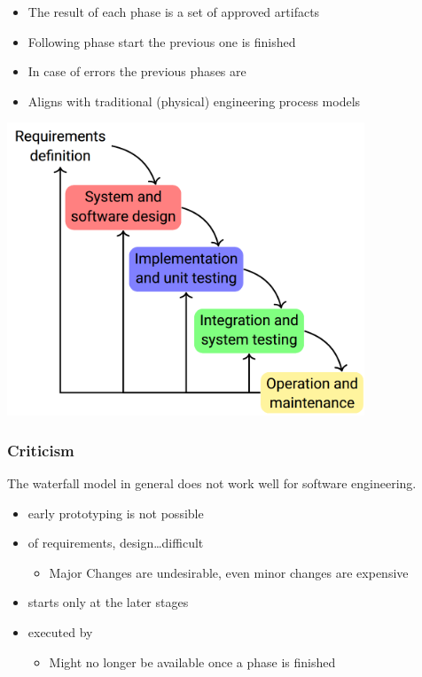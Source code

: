 \documentclass[
    ../../Software_Engineering_Summary.tex,
]
{subfiles}
\begin{document}
\begin{minipage}
    [c]{0.45\textwidth}
    \begin{itemize}
        \item The result of each phase is a set of approved artifacts
        \item Following phase start  the previous one is finished
        \item In case of errors the previous phases are 
        \item Aligns with traditional (physical) engineering process models
    \end{itemize}
\end{minipage}
\begin{minipage}
    [c]{0.55\textwidth}
    \centering
    \includegraphics[width = 0.8\textwidth]{Pics/13/WaterfallModel.png}
\end{minipage}

\subsubsection{Criticism}
The waterfall model in general does not work well for software engineering.
\begin{itemize}
    \item {} early prototyping is not possible
    \item {} of requirements, design\dots difficult 
    \begin{itemize}
        \item Major Changes are undesirable, even minor changes are expensive
    \end{itemize}
    \item {} starts only at the later stages
    \item {} executed by 
    \begin{itemize}
        \item Might no longer be available once a phase is finished
    \end{itemize}
\end{itemize}
\end{document}
